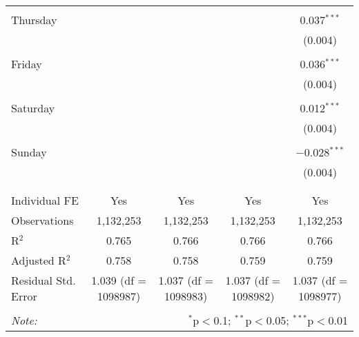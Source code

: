 \documentclass[
]{article}
\begin{document}
\begin{table}[!htbp]
{\begin{tabular}{@{\extracolsep{5pt}}lcccc}
  & & & & \\ 
 Thursday &  &  &  & 0.037$^{***}$ \\ 
  &  &  &  & (0.004) \\ 
  & & & & \\ 
 Friday &  &  &  & 0.036$^{***}$ \\ 
  &  &  &  & (0.004) \\ 
  & & & & \\ 
 Saturday &  &  &  & 0.012$^{***}$ \\ 
  &  &  &  & (0.004) \\ 
  & & & & \\ 
 Sunday &  &  &  & $-$0.028$^{***}$ \\ 
  &  &  &  & (0.004) \\ 
  & & & & \\ 
\hline \\[-1.8ex] 
Individual FE & Yes & Yes & Yes & Yes \\ 
Observations & 1,132,253 & 1,132,253 & 1,132,253 & 1,132,253 \\ 
R$^{2}$ & 0.765 & 0.766 & 0.766 & 0.766 \\ 
Adjusted R$^{2}$ & 0.758 & 0.758 & 0.759 & 0.759 \\ 
Residual Std. Error & 1.039 (df = 1098987) & 1.037 (df = 1098983) & 1.037 (df = 1098982) & 1.037 (df = 1098977) \\ 
\hline 
\hline \\[-1.8ex] 
\textit{Note:}  & \multicolumn{4}{r}{$^{*}$p$<$0.1; $^{**}$p$<$0.05; $^{***}$p$<$0.01} \\ 
\end{tabular}
} 
\end{table} 
\newpage
\end{document}
